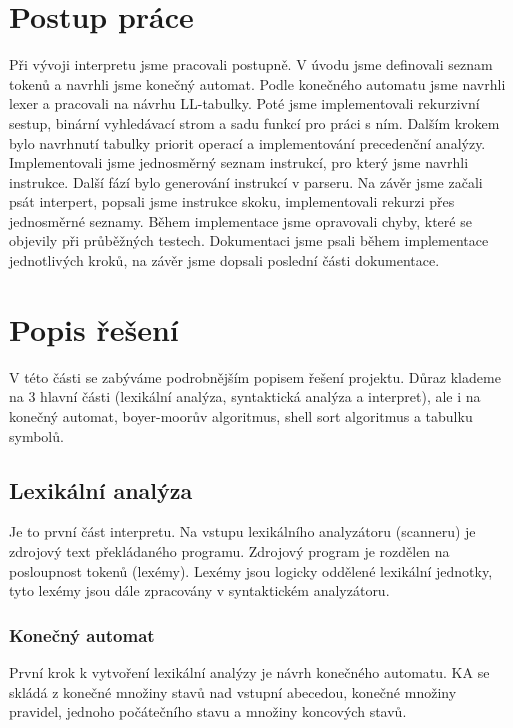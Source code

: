\documentclass[11pt,a4paper,titlepage]{article}
\begin{document}
\section{Postup práce}\label{3}
\bigskip
\hspace{1cm}Při vývoji interpretu jsme pracovali postupně. V úvodu jsme definovali seznam tokenů a navrhli jsme konečný automat. Podle konečného automatu jsme navrhli lexer a pracovali na návrhu LL-tabulky. Poté jsme implementovali  rekurzivní sestup, binární vyhledávací strom a sadu funkcí pro práci s ním. Dalším krokem bylo navrhnutí tabulky priorit operací a implementování precedenční analýzy. Implementovali jsme jednosměrný seznam instrukcí, pro který jsme navrhli instrukce. Další fází bylo generování instrukcí v parseru. Na závěr jsme začali psát interpert, popsali jsme instrukce skoku, implementovali rekurzi přes jednosměrné seznamy. Během implementace jsme opravovali chyby, které se objevily při průběžných testech. Dokumentaci jsme psali během implementace jednotlivých kroků, na závěr jsme dopsali poslední části dokumentace.
\smallskip


\section{Popis řešení}   \label{4}
\bigskip
	\hspace{1cm} V této části se zabýváme podrobnějším popisem řešení projektu. Důraz klademe na 3 hlavní části (lexikální analýza, syntaktická analýza a interpret), ale i na konečný automat, boyer-moorův algoritmus, shell sort algoritmus a tabulku symbolů.
\smallskip


\subsection{Lexikální analýza}
\bigskip

	\hspace{1cm} Je to první část interpretu. Na vstupu lexikálního analyzátoru (scanneru) je zdrojový text překládaného programu. Zdrojový program je rozdělen na posloupnost tokenů (lexémy). Lexémy jsou logicky oddělené lexikální jednotky, tyto lexémy jsou dále zpracovány v syntaktickém analyzátoru.
	\bigskip

	
	\subsubsection{Konečný automat}
	\bigskip
		\hspace{1cm} První krok k vytvoření lexikální analýzy je návrh konečného automatu. KA se skládá z konečné množiny stavů nad vstupní abecedou, konečné množiny pravidel, jednoho počátečního stavu a množiny koncových stavů. \\
	
\end{document}

